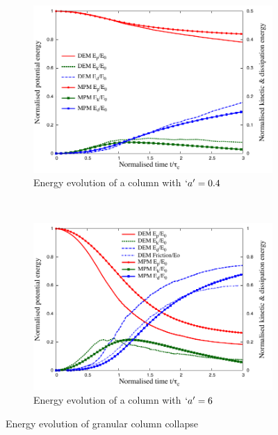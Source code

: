 \begin{figure}[tbhp]
\centering
\begin{subfigure}[b]{0.975\textwidth}
\includegraphics[width=\textwidth]{a04_energy}
\caption{Energy evolution of a column with $`a'=0.4$}
\label{fig:a04_energy}
\end{subfigure}
\\
\begin{subfigure}[b]{0.975\textwidth}
\centering
\includegraphics[width=\textwidth]{a6_energy}
\caption{Energy evolution of a column with $`a'=6$}
\label{fig:a6_energy}
\end{subfigure}
\caption{Energy evolution of granular column collapse}
\label{fig:column_energy}
\end{figure}


